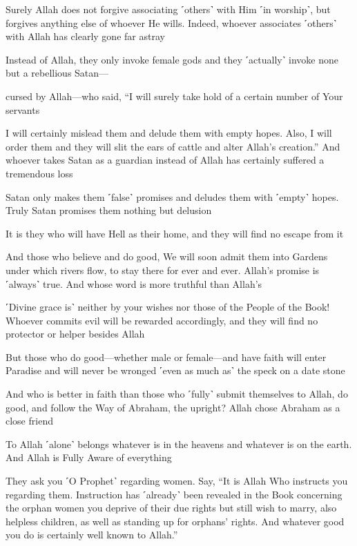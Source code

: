 Surely Allah does not forgive associating ˹others˺ with Him ˹in worship˺, but forgives anything else of whoever He wills. Indeed, whoever associates ˹others˺ with Allah has clearly gone far astray

Instead of Allah, they only invoke female gods and they ˹actually˺ invoke none but a rebellious Satan—

cursed by Allah—who said, “I will surely take hold of a certain number of Your servants

I will certainly mislead them and delude them with empty hopes. Also, I will order them and they will slit the ears of cattle and alter Allah’s creation.” And whoever takes Satan as a guardian instead of Allah has certainly suffered a tremendous loss

Satan only makes them ˹false˺ promises and deludes them with ˹empty˺ hopes. Truly Satan promises them nothing but delusion

It is they who will have Hell as their home, and they will find no escape from it

And those who believe and do good, We will soon admit them into Gardens under which rivers flow, to stay there for ever and ever. Allah’s promise is ˹always˺ true. And whose word is more truthful than Allah’s

˹Divine grace is˺ neither by your wishes nor those of the People of the Book! Whoever commits evil will be rewarded accordingly, and they will find no protector or helper besides Allah

But those who do good—whether male or female—and have faith will enter Paradise and will never be wronged ˹even as much as˺ the speck on a date stone

And who is better in faith than those who ˹fully˺ submit themselves to Allah, do good, and follow the Way of Abraham, the upright? Allah chose Abraham as a close friend

To Allah ˹alone˺ belongs whatever is in the heavens and whatever is on the earth. And Allah is Fully Aware of everything

They ask you ˹O Prophet˺ regarding women. Say, “It is Allah Who instructs you regarding them. Instruction has ˹already˺ been revealed in the Book concerning the orphan women you deprive of their due rights but still wish to marry, also helpless children, as well as standing up for orphans’ rights. And whatever good you do is certainly well known to Allah.”

